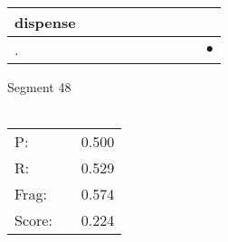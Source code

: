 \documentclass[landscape]{article}
\newcommand{\ssp}{\hspace{2pt}}
\newcommand{\mex}{\cellcolor{g}$\bullet$}
\begin{document}
\begin{tabular}{|l|p{10pt}|p{10pt}|p{10pt}|p{10pt}|p{10pt}|p{10pt}|p{10pt}|p{10pt}|p{10pt}|}
\hline
\ssp dispense \ssp&\hspace{2pt}&\hspace{2pt}&\hspace{2pt}&\hspace{2pt}&\hspace{2pt}&\hspace{2pt}&\hspace{2pt}&\hspace{2pt}&\hspace{2pt}\\
\hline
\ssp \cellcolor{ref8}. \ssp&\hspace{2pt}&\hspace{2pt}&\hspace{2pt}&\hspace{2pt}&\hspace{2pt}&\hspace{2pt}&\hspace{2pt}&\hspace{2pt}&\hspace{2pt}\mex\\
\hline
\end{tabular}

\vspace{6pt}
\noindent Segment 48\\\\
\noindent\begin{tabular}{lm{12pt}r}
\hline
P:&&0.500\\
R:&&0.529\\
Frag:&&0.574\\
Score:&&0.224\\
\end{tabular}

\newpage
\end{document}
